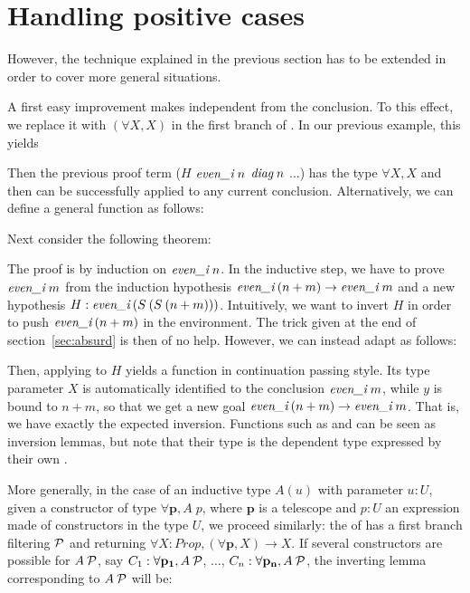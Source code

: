 \section{Handling positive cases}
\label{sec:improvement}

However, 
the technique explained in the previous section 
has to be extended in order to cover more general
situations. 

A first easy improvement makes \diag independent
from the conclusion.
To this effect, we replace it with $(\forall X, X)$ 
in the first branch of \diag.
In our previous example, this yields


\noindent
Then the previous proof term 
(\match $H$ \intac $\textit{even\_i}\;n$ \retac $\textit{diag}\;n$  $\ldots$)
has the type $\forall X, X$
and then can be successfully applied to any current conclusion.
Alternatively, we can define a general function as follows:



\medskip
Next consider the following theorem:


\noindent
The proof is by induction on $\textit{even\_i}\;n$.
In the inductive step, we have to prove $\textit{even\_i}\;m$
from the induction hypothesis $\textit{even\_i}\:(n + m) \rightarrow \textit{even\_i}\;m$
and a new hypothesis $H: \textit{even\_i}\: (S\: (S\: (n + m)))$.
Intuitively, we want to invert $H$ in order to push $\textit{even\_i}\:(n + m)$
in the environment. 
The trick given at the end of section~\ref{sec:absurd}
is then of no help.
However, we can instead adapt \prone as follows:


\noindent
Then, applying \prET to $H$ yields a function in continuation passing style.
Its type parameter $X$ is automatically identified to the conclusion
$\textit{even\_i}\;m$, while $y$ is bound to $n+m$,
so that we get a new goal $\textit{even\_i}\:(n+m) \rightarrow \textit{even\_i}\;m$.
That is, we have exactly the expected inversion.
Functions such as \prone and \prET can be seen as inversion
lemmas, but note that their type is the dependent type
expressed by their own \diag.

More generally,
in the case of an inductive type $A(u)$ with parameter $u:U$,
given a constructor of type $\forall \mathbf{p}, A \;p$, 
where $\mathbf{p}$ is a telescope and $p:U$ an expression made
of constructors in the type $U$,
we proceed similarly:
the \match of \diag has a first branch filtering $\cal P$
and returning 
$\forall X: Prop, (\forall \mathbf{p}, X) \rightarrow X$.
If several constructors are possible for $A \:\cal P$,
say $C_1: \forall \mathbf{p_1}, A \:\cal P$,
$\ldots$, $C_n: \forall \mathbf{p_n}, A \:\cal P$,
the inverting lemma corresponding to $A \:\cal P$ will be:

